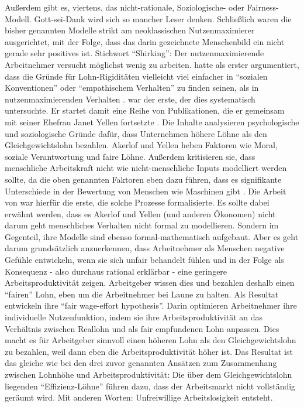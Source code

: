 Außerdem gibt es, viertens, das nicht-rationale, Soziologische- oder Fairness-Modell. Gott-sei-Dank wird sich so mancher Leser denken. Schließlich waren die bisher genannten Modelle strikt am neoklassischen Nutzenmaximierer ausgerichtet, mit der Folge, dass das darin gezeichnete Menschenbild ein nicht gerade sehr positives ist. Stichwort "`Shirking"': Der nutzenmaximierende Arbeitnehmer versucht möglichst wenig zu arbeiten. \textcite{Solow1980} hatte als erster argumentiert, dass die Gründe für Lohn-Rigiditäten vielleicht viel einfacher in "`sozialen Konventionen"' oder "`empathischem Verhalten"' zu finden seinen, als in nutzenmaximierenden Verhalten \parencite[S. 204]{Yellen1984}.  \textcite{Akerlof1982} war der erste, der dies systematisch untersuchte. Er startet damit eine Reihe von Publikationen, die er gemeinsam mit seiner Ehefrau Janet Yellen fortsetzte \parencite{Akerlof1984, AkerlofYellen1987, AkerlofYellen1988, AkerlofYellen1990}. Die Inhalte analysieren psychologische und soziologische Gründe dafür, dass Unternehmen höhere Löhne als den Gleichgewichtslohn bezahlen. Akerlof und Yellen heben Faktoren wie Moral, soziale Verantwortung und faire Löhne. Außerdem kritisieren sie, dass menschliche Arbeitskraft nicht wie nicht-menschliche Inputs modelliert werden sollte, da die oben genannten Faktoren eben dazu führen, dass es signifikante Unterschiede in der Bewertung von Menschen wie Maschinen gibt \parencite[S. 392]{Snowdon2005}. Die Arbeit von \textcite{Akerlof1982} war hierfür die erste, die solche Prozesse formalisierte. Es sollte dabei erwähnt werden, dass es Akerlof und Yellen (und anderen Ökonomen) nicht darum geht menschliches Verhalten nicht formal zu modellieren. Sondern im Gegenteil, ihre Modelle sind ebenso formal-mathematisch aufgebaut. Aber es geht darum grundsätzlich anzuerkennen, dass Arbeitnehmer als Menschen negative Gefühle entwickeln, wenn sie sich unfair behandelt fühlen und in der Folge als Konsequenz - also durchaus rational erklärbar - eine geringere Arbeitsproduktivität zeigen. Arbeitgeber wissen dies und bezahlen deshalb einen "`fairen"' Lohn, eben um die Arbeitnehmer bei Laune zu halten. Als Resultat entwickeln \textcite{AkerlofYellen1990} ihre "`fair wage-effort hypothesis"'. Darin optimieren Arbeitnehmer ihre individuelle Nutzenfunktion, indem sie ihre Arbeitsproduktivität an das Verhältnis zwischen Reallohn und als fair empfundenen Lohn anpassen. Dies macht es für Arbeitgeber sinnvoll einen höheren Lohn als den Gleichgewichtslohn zu bezahlen, weil dann eben die Arbeitsproduktivität höher ist. Das Resultat ist das gleiche wie bei den drei zuvor genannten Ansätzen zum Zusammenhang zwischen Lohnhöhe und Arbeitsproduktivität: Die über dem Gleichgewichtslohn liegenden "`Effizienz-Löhne"' führen dazu, dass der Arbeitsmarkt nicht vollständig geräumt wird. Mit anderen Worten: Unfreiwillige Arbeitslosigkeit entsteht. 

